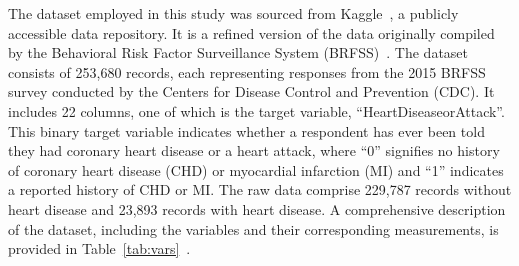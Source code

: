 \documentclass[11pt,a4paper]{article}
\begin{document}
The dataset employed in this study was sourced from Kaggle~\cite{teboul}, a
publicly accessible data repository. It is a refined version of the data
originally compiled by the Behavioral Risk Factor Surveillance System
(BRFSS)~\cite{brfss}. The dataset consists of 253,680 records, each
representing responses from the 2015 BRFSS survey conducted by the Centers
for Disease Control and Prevention (CDC). It includes 22 columns, one of
which is the target variable, ``HeartDiseaseorAttack''. This binary target
variable indicates whether a respondent has ever been told they had coronary
heart disease or a heart attack, where ``0'' signifies no history of coronary heart disease (CHD) or myocardial
infarction (MI) and ``1'' indicates a reported history of CHD or MI. The raw
data comprise 229,787 records without heart disease and 23,893 records with
heart disease. A comprehensive description of the dataset, including the
variables and their corresponding measurements, is provided in
Table~\ref{tab:vars}~\cite{brfsscalc}.
\end{document}
